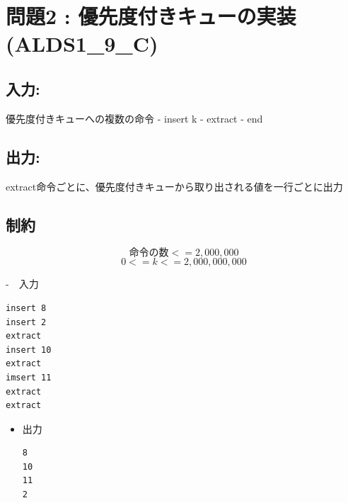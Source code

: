 \documentclass[a4paper,dvipdfmx]{jsarticle}
\begin{document}
    \section{問題2 :
優先度付きキューの実装(ALDS1\_9\_C)}\label{ux554fux984c2-ux512aux5148ux5ea6ux4ed8ux304dux30adux30e5ux30fcux306eux5b9fux88c5alds1_9_c}

\subsection{入力:}\label{ux5165ux529b}

優先度付きキューへの複数の命令 - insert k - extract - end

\subsection{出力:}\label{ux51faux529b}

extract命令ごとに、優先度付きキューから取り出される値を一行ごとに出力

\subsection{制約}\label{ux5236ux7d04}

\[命令の数 <= 2,000,000\] \[0 <= k <= 2,000,000,000\]

    -　入力

\begin{verbatim}
insert 8
insert 2
extract
insert 10
extract
imsert 11
extract
extract
\end{verbatim}

\begin{itemize}
\item
  出力

\begin{verbatim}
8
10
11
2
\end{verbatim}
\end{itemize}



    
    
    
    
\end{document}
